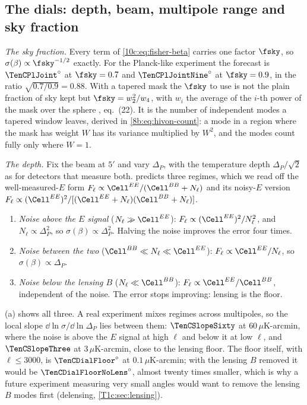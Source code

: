 \subsection{The dials: depth, beam, multipole range and sky fraction}
\label{10c:sec:dials}

\emph{The sky fraction.} Every term of \eqref{10c:eq:fisher-beta} carries one factor $\fsky$, so
$\sigma(\beta)\propto\fsky^{-1/2}$ exactly. For the Planck-like experiment the forecast is ${\TenCPlJoint}^\circ$ at
$\fsky=0.7$ and ${\TenCPlJointNine}^\circ$ at $\fsky=0.9$, in the ratio $\sqrt{0.7/0.9}=0.88$. With a tapered mask the
$\fsky$ to use is not the plain fraction of sky kept but $\fsky=w_2^2/w_4$, with $w_i$ the average of the $i$-th
power of the mask over the sphere \cite{EskiltKomatsu2022}, eq.~(22). It is the number of independent modes a tapered window leaves, derived in
\cref{8b:eq:hivon-count}: a mode in a region where the mask has weight $W$ has its variance multiplied by $W^2$, and
the modes count fully only where $W=1$.

\emph{The depth.} Fix the beam at $5'$ and vary $\Delta_P$, with the temperature depth $\Delta_P/\sqrt2$ as for
detectors that measure both.  predicts three regimes, which we read off the
well-measured-$E$ form $F_\ell\propto\Cell^{EE}/(\Cell^{BB}+N_\ell)$ and its noisy-$E$ version
$F_\ell\propto(\Cell^{EE})^2/[(\Cell^{EE}+N_\ell)(\Cell^{BB}+N_\ell)]$.
\begin{enumerate}[leftmargin=1.6em,itemsep=2pt]
  \item \emph{Noise above the $E$ signal} ($N_\ell\gg\Cell^{EE}$): $F_\ell\propto(\Cell^{EE})^2/N_\ell^2$, and $N_\ell\propto\Delta_P^2$,
        so $\sigma(\beta)\propto\Delta_P^2$. Halving the noise improves the error four times.
  \item \emph{Noise between the two} ($\Cell^{BB}\ll N_\ell\ll\Cell^{EE}$): $F_\ell\propto\Cell^{EE}/N_\ell$, so $\sigma(\beta)\propto\Delta_P$.
  \item \emph{Noise below the lensing $B$} ($N_\ell\ll\Cell^{BB}$): $F_\ell\propto\Cell^{EE}/\Cell^{BB}$, independent of the noise. The
        error stops improving: lensing is the floor.
\end{enumerate}
(a) shows all three. A real experiment mixes regimes across multipoles, so the local slope
$\dd\ln\sigma/\dd\ln\Delta_P$ lies between them: $\TenCSlopeSixty$ at $60\,\mu$K-arcmin, where the noise is above the $E$
signal at high $\ell$ and below it at low $\ell$, and $\TenCSlopeThree$ at $3\,\mu$K-arcmin, close to the lensing
floor. The floor itself, with $\ell\le3000$, is ${\TenCDialFloor}^\circ$ at $0.1\,\mu$K-arcmin; with the lensing $B$
removed it would be ${\TenCDialFloorNoLens}^\circ$, almost twenty times smaller, which is why a future experiment measuring
very small angles would want to remove the lensing $B$ modes first (delensing, \cref{T1c:sec:lensing}).

